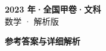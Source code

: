 \documentclass[zihao=-4, a4paper]{ctexart}
\begin{document}
\begin{center}
  {\Large\bfseries 2023 年·全国甲卷·文科}\\[4pt]
  {\large 数学 · 解析版}
\end{center}
\medskip
{}

\clearpage
{}
\begin{center}{\Large\bfseries 参考答案与详细解析}\end{center}
\medskip

\end{document}
